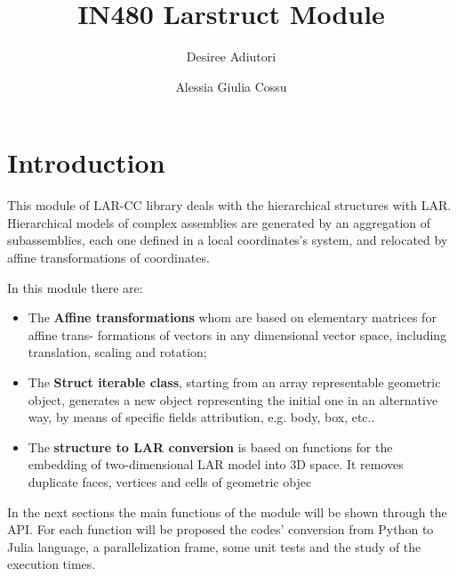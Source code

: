 \documentclass[a4paper,12pt]{article}
\begin{document}
\title{IN480 \hspace{0.5cm} Larstruct Module}
\author{Desiree Adiutori \and Alessia Giulia Cossu}
\maketitle
\tableofcontents
\listoffigures
\newpage
\section*{Introduction}
This module of LAR-CC library deals with the hierarchical structures with LAR. Hierarchical
models of complex assemblies are generated by an aggregation of subassemblies, each one defined
in a local coordinates's system, and relocated by affine transformations of coordinates.

In this module there are:
\begin{itemize}
\item The \textbf{Affine transformations} whom are based on elementary matrices for affine trans-
formations of vectors in any dimensional vector space, including translation, scaling and
rotation;
\item The \textbf{Struct iterable class}, starting from an array representable geometric object, generates a new object representing the initial one in an alternative way, 
by means of specific fields attribution, e.g. body, box, etc..
\item The \textbf{structure to LAR conversion} is based on functions for the embedding of two-dimensional LAR model into 3D space. 
It removes duplicate faces, vertices and cells of
geometric objec
\end{itemize}

In the next sections the main functions of the module will be shown through the API. For each
function will be proposed the codes' conversion from Python to Julia language, a parallelization
frame, some unit tests and the study of the execution times.
\newpage
\end{document}
